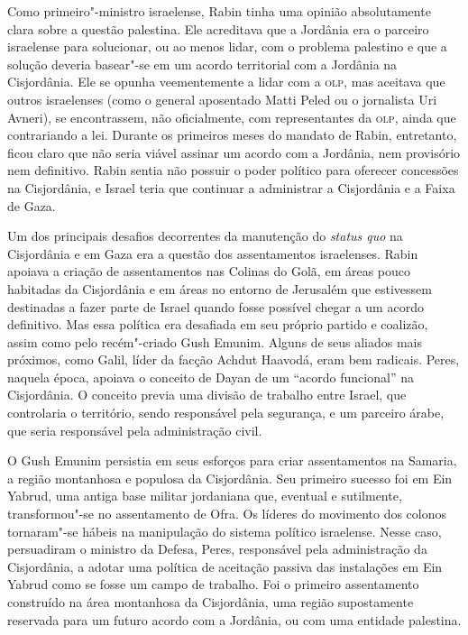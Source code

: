 Como primeiro"-ministro israelense, Rabin tinha uma opinião absolutamente
clara sobre a questão palestina. Ele acreditava que a Jordânia era o
parceiro israelense para solucionar, ou ao menos lidar, com o problema
palestino e que a solução deveria basear"-se em um acordo territorial com
a Jordânia na Cisjordânia. Ele se opunha veementemente a lidar com a \textsc{olp},
mas aceitava que outros israelenses (como o general aposentado Matti
Peled ou o jornalista Uri Avneri), se encontrassem, não oficialmente,
com representantes da \textsc{olp}, ainda que contrariando a lei. Durante os
primeiros meses do mandato de Rabin, entretanto, ficou claro que não
seria viável assinar um acordo com a Jordânia, nem provisório nem
definitivo. Rabin sentia não possuir o poder político para oferecer
concessões na Cisjordânia, e Israel teria que continuar a administrar a
Cisjordânia e a Faixa de Gaza.

Um dos principais desafios decorrentes da manutenção do \emph{status
quo} na Cisjordânia e em Gaza era a questão dos assentamentos
israelenses. Rabin apoiava a criação de assentamentos nas Colinas do
Golã, em áreas pouco habitadas da Cisjordânia e em áreas no entorno de
Jerusalém que estivessem destinadas a fazer parte de Israel quando fosse
possível chegar a um acordo definitivo. Mas essa política era desafiada
em seu próprio partido e coalizão, assim como pelo recém"-criado Gush
Emunim. Alguns de seus aliados mais próximos, como Galil, líder da
facção Achdut Haavodá, eram bem radicais. Peres, naquela época, apoiava
o conceito de Dayan de um ``acordo funcional'' na Cisjordânia. O
conceito previa uma divisão de trabalho entre Israel, que controlaria o
território, sendo responsável pela segurança, e um parceiro árabe, que
seria responsável pela administração civil.

O Gush Emunim persistia em seus esforços para criar assentamentos na
Samaria, a região montanhosa e populosa da Cisjordânia. Seu primeiro
sucesso foi em Ein Yabrud, uma antiga base militar jordaniana que,
eventual e sutilmente, transformou"-se no assentamento de Ofra. Os
líderes do movimento dos colonos tornaram"-se hábeis na manipulação do
sistema político israelense. Nesse caso, persuadiram o ministro da
Defesa, Peres, responsável pela administração da Cisjordânia, a adotar
uma política de aceitação passiva das instalações em Ein Yabrud como se
fosse um campo de trabalho. Foi o primeiro assentamento construído na
área montanhosa da Cisjordânia, uma região supostamente reservada para um
futuro acordo com a Jordânia, ou com uma entidade palestina.

